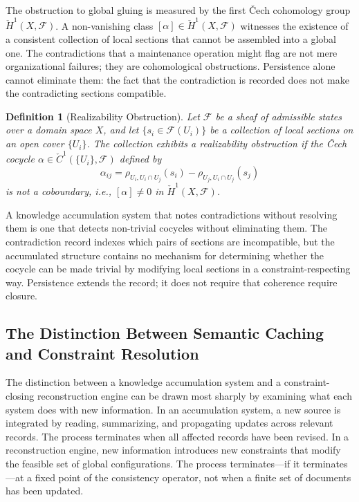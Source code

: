 \documentclass[12pt, oneside]{article}
\newtheorem{definition}{Definition}
\begin{document}
The obstruction to global gluing is measured by the first \v{C}ech cohomology group $\check{H}^1(X, \mathcal{F})$. A non-vanishing class $[\alpha] \in \check{H}^1(X, \mathcal{F})$ witnesses the existence of a consistent collection of local sections that cannot be assembled into a global one. The contradictions that a maintenance operation might flag are not mere organizational failures; they are cohomological obstructions. Persistence alone cannot eliminate them: the fact that the contradiction is recorded does not make the contradicting sections compatible.

\begin{definition}[Realizability Obstruction]
Let $\mathcal{F}$ be a sheaf of admissible states over a domain space $X$, and let $\{s_i \in \mathcal{F}(U_i)\}$ be a collection of local sections on an open cover $\{U_i\}$. The collection exhibits a realizability obstruction if the \v{C}ech cocycle $\alpha \in \check{C}^1(\{U_i\}, \mathcal{F})$ defined by
\begin{equation}
  \alpha_{ij} = \rho_{U_i, U_i \cap U_j}(s_i) - \rho_{U_j, U_i \cap U_j}(s_j)
\end{equation}
is not a coboundary, i.e., $[\alpha] \neq 0$ in $\check{H}^1(X, \mathcal{F})$.
\end{definition}

A knowledge accumulation system that notes contradictions without resolving them is one that detects non-trivial cocycles without eliminating them. The contradiction record indexes which pairs of sections are incompatible, but the accumulated structure contains no mechanism for determining whether the cocycle can be made trivial by modifying local sections in a constraint-respecting way. Persistence extends the record; it does not require that coherence require closure.

\subsection{The Distinction Between Semantic Caching and Constraint Resolution}

The distinction between a knowledge accumulation system and a constraint-closing reconstruction engine can be drawn most sharply by examining what each system does with new information. In an accumulation system, a new source is integrated by reading, summarizing, and propagating updates across relevant records. The process terminates when all affected records have been revised. In a reconstruction engine, new information introduces new constraints that modify the feasible set of global configurations. The process terminates---if it terminates---at a fixed point of the consistency operator, not when a finite set of documents has been updated.
\end{document}
